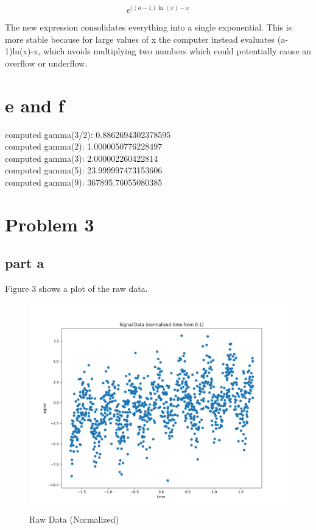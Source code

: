 \documentclass{article}
\begin{document}
\begin{equation}
    e^{((a-1)\ln(x)-x}
\end{equation}

The new expression consolidates everything into a single exponential. This is more stable because for large values of x the computer instead evaluates (a-1)ln(x)-x, which avoids multiplying two numbers which could potentially cause an overflow or underflow.

\section{e and f}

computed gamma(3/2): 0.8862694302378595 \\
computed gamma(2): 1.0000050776228497 \\
computed gamma(3): 2.000002260422814 \\
computed gamma(5): 23.999997473153606 \\
computed gamma(9): 367895.76055080385 \\

\section{Problem 3}

\subsection{part a}
Figure 3 shows a plot of the raw data.


\begin{figure}[h]
    \centering
    \includegraphics[width=.8\linewidth]{ps5_figs/3a.png}
    \caption{Raw Data (Normalized)}
    \label{fig:enter-label}
\end{figure}
\end{document}
